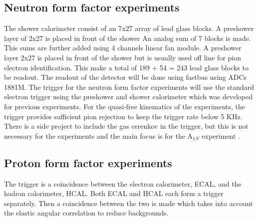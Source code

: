 \documentclass[]{article}
\begin{document}
 \subsection{Neutron form factor experiments}
 \label{sec:neutron-trig}
 The shower calorimeter consist of an 7x27 array of  lead glass blocks. A preshower
 layer of 2x27 is placed in front of the shower
 An analog sum of 7 blocks is made. This sums are further added using 4 channels linear fan module.
 A preshower layer 2x27 is placed in front of the shower but is usually 
 used off line for pion electron identification. 
 This make a total of 189 + 54 = 243 lead glass blocks to be readout.
 The readout of the detector will be done using fastbus using ADCs 1881M.
 The trigger for the neutron form factor experiments will use the 
 standard electron trigger using the preshower and shower calorimeter which was developed for previous experiments. 
 For the quasi-free kinematics of the experiments, the trigger provides sufficient pion rejection to keep the
 trigger rate below 5 KHz. There is a side project to include the gas cerenkov in the trigger, but this
 is not necessary for the experiments and the main focus is for the A$_{1N}$ experiment .
 
 \subsection{Proton form factor experiments}
 The trigger is a coincidence between the electron calorimeter, ECAL,  and the hadron calorimeter, HCAL.
 Both ECAL and HCAL each form a trigger separately. Then a coincidence between the two is made which
 takes into account the elastic angular correlation to reduce backgrounds.
 
\end{document}
